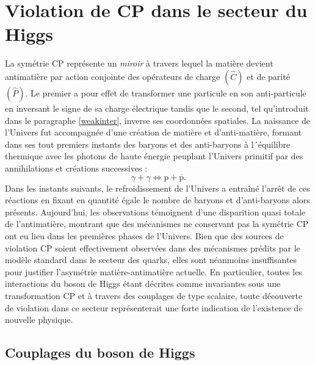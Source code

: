\chapter{Violation de CP dans le secteur du Higgs}
\label{violCP}

La symétrie CP représente un \textit{miroir} à travers lequel la matière devient antimatière par action conjointe des opérateurs de charge $(\hat{C})$ et de parité $(\hat{P})$. Le premier a pour effet de transformer une particule en son anti-particule en inversant le signe de sa charge électrique tandis que le second, tel qu'introduit dans le paragraphe \ref{weakinter}, inverse ses coordonnées spatiales. La naissance de l'Univers fut accompagnée d'une création de matière et d'anti-matière, formant dans ses tout premiers instants des baryons et des anti-baryons à l´équilibre thermique avec les photons de haute énergie peuplant l'Univers primitif par des annihilations et créations successives : $$\gamma+\gamma\Longleftrightarrow \mbox{p}+\overline{\mbox{p}}.$$ 
Dans les instants suivants, le refroidissement de l'Univers a entraîné l'arrêt de ces réactions en fixant en quantité égale le nombre de baryons et d'anti-baryons alors présents. Aujourd'hui, les observations témoignent d'une disparition quasi totale de l'antimatière, montrant que des mécanismes ne conservant pas la symétrie CP ont eu lieu dans les premières phases de l'Univers. Bien que des sources de violation CP soient effectivement observées dans des mécanismes prédits par le modèle standard dans le secteur des quarks, elles sont néanmoins insuffisantes pour justifier l'asymétrie matière-antimatière actuelle. En particulier, toutes les interactions du boson de Higgs étant décrites comme invariantes sous une transformation CP et à travers des couplages de type scalaire, toute découverte de violation dans ce secteur représenterait une forte indication de l'existence de nouvelle physique. 

\section{Couplages du boson de Higgs}
\label{decays}


